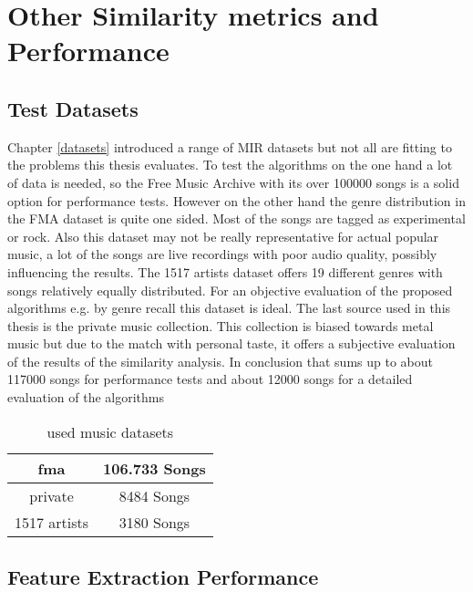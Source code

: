 
\chapter{Other Similarity metrics and Performance}\label{simmet}

\section{Test Datasets}

Chapter \ref{datasets} introduced a range of MIR datasets but not all are fitting to the problems this thesis evaluates. To test the algorithms on the one hand a lot of data is needed, so the Free Music Archive with its over 100000 songs is a solid option for performance tests. However on the other hand the genre distribution in the FMA dataset is quite one sided. Most of the songs are tagged as experimental or rock. Also this dataset may not be really representative for actual popular music, a lot of the songs are live recordings with poor audio quality, possibly influencing the results.
The 1517 artists dataset offers 19 different genres with songs relatively equally distributed. For an objective evaluation of the proposed algorithms e.g. by genre recall this dataset is ideal.
The last source used in this thesis is the private music collection. This collection is biased towards metal music but due to the match with personal taste, it offers a subjective evaluation of the results of the similarity analysis. 
In conclusion that sums up to about 117000 songs for performance tests and about 12000 songs for a detailed evaluation of the algorithms

\begin{table}[h]
	\caption{used music datasets}
	\label{used_dsets}
	\begin{center}
		\begin{tabular}{|c||c|}
			\hline
			fma & 106.733 Songs\\
			\hline
			private & 8484 Songs\\
			\hline
			1517 artists & 3180 Songs\\
			\hline
		\end{tabular}
	\end{center}
\end{table}


\section{Feature Extraction Performance}

